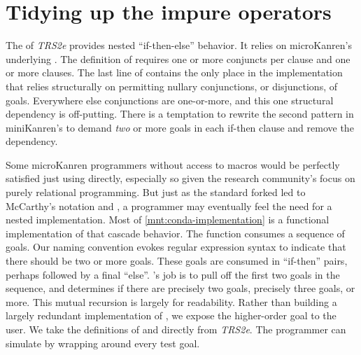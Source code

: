 \documentclass[sigplan,balance=true,pbalance=true,natbib=false]{acmart}
\begin{document}
\section{Tidying up the impure operators}\label{sec:impure}

The  of \emph{TRS2e} provides nested
\enquote{if-then-else} behavior. It relies on microKanren's
underlying . The definition of 
requires one or more conjuncts per clause and one or more clauses. The
last line of  contains the only place in the
implementation that relies structurally on permitting nullary
conjunctions, or disjunctions, of goals. Everywhere else conjunctions
are one-or-more, and this one structural dependency is off-putting.
There is a temptation to rewrite the second pattern in
miniKanren's  to demand \emph{two} or more goals in
each if-then clause and remove the dependency.

Some microKanren programmers without access to macros would be perfectly
satisfied just using  directly, especially so given
the research community's focus on purely relational programming. But
just as the standard forked  led to
McCarthy's  notation and , a
programmer may eventually feel the need for a nested implementation.
Most of \cref{mnt:conda-implementation} is a functional implementation
of that cascade behavior. The  function consumes a
sequence of goals. Our  naming convention evokes
regular expression syntax to indicate that there should be two or more
goals. These goals are consumed in \enquote{if-then} pairs, perhaps
followed by a final \enquote{else}. 's job is to pull
off the first two goals in the sequence, and  determines
if there are precisely two goals, precisely three goals, or more.
This mutual recursion is largely for readability. Rather than building
a largely redundant implementation of , we expose
the higher-order goal  to the user. We take the
definitions of  and  directly from
\emph{TRS2e}. The programmer can simulate  by
wrapping  around every test goal.
\end{document}
